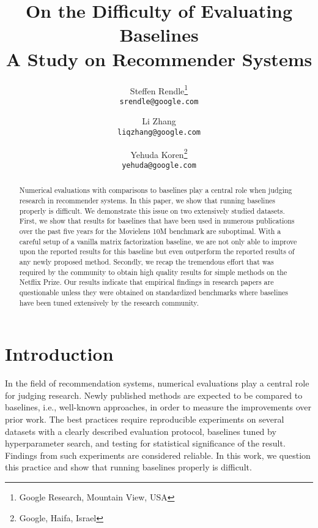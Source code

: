 \documentclass{article}
\title{On the Difficulty of Evaluating Baselines \\
{\large A Study on Recommender Systems}}
\author{
  \and
  Steffen Rendle\thanks{Google Research, Mountain View, USA}\\
  \texttt{srendle@google.com}
  \and
  Li Zhang\footnotemark[1]\\
  \texttt{liqzhang@google.com}
  \and
  Yehuda Koren\thanks{Google, Haifa, Israel}\\
  \texttt{yehuda@google.com}
}
\date{\vspace{-6.0ex}}
\begin{document}
\maketitle
\setcounter{footnote}{-1}


\begin{abstract}
Numerical evaluations with comparisons to baselines play a central role when judging research in recommender systems.
In this paper, we show that running baselines properly is difficult.
We demonstrate this issue on two extensively studied datasets.
First, we show that results for baselines that have been used in numerous publications over the past five years for the Movielens 10M benchmark are suboptimal.
With a careful setup of a vanilla matrix factorization baseline, we are not only able to improve upon the reported results for this baseline but even outperform the reported results of any newly proposed method.
Secondly, we recap the tremendous effort that was required by the community to obtain high quality results for simple methods on the Netflix Prize.
Our results indicate that empirical findings in research papers are questionable unless they were obtained on standardized benchmarks where baselines have been tuned extensively by the research community.
\end{abstract}


\section{Introduction}

In the field of recommendation systems, numerical evaluations play a central role for judging research.
Newly published methods are expected to be compared to baselines, i.e., well-known approaches, in order to measure the improvements over prior work.
The best practices require reproducible experiments on several datasets with a clearly described evaluation protocol, baselines tuned by hyperparameter search, and testing for statistical significance of the result.
Findings from such experiments are considered reliable.
In this work, we question this practice and show that running baselines properly is difficult.
\end{document}
